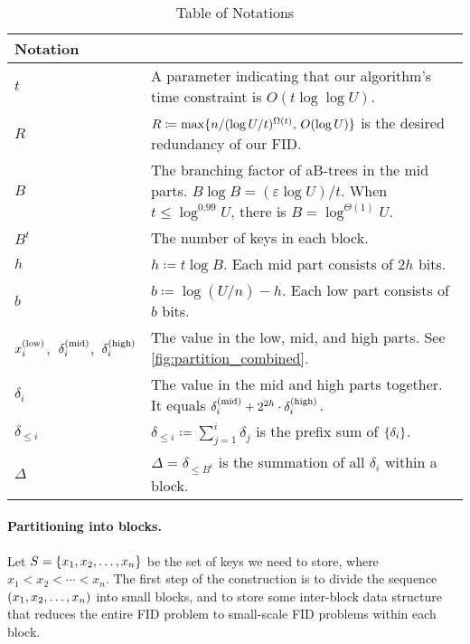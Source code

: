\documentclass{article}
\theoremstyle{plain}
\theoremstyle{definition}  \newtheorem{definition}[theorem]{Definition}
\DeclarePairedDelimiter{\bk}{(}{)}
\DeclarePairedDelimiter{\BK}{\{}{\}}
\newcommand{\defeq}{\coloneqq}
\newcommand{\eps}{\varepsilon}
\renewcommand{\epsilon}{\eps}
\newcommand{\xlow}[1][i]{x_{#1}^{(\textup{low})}}
\newcommand{\deltamid}[1][i]{\delta_{#1}^{(\textup{mid})}}
\newcommand{\deltahigh}[1][i]{\delta_{#1}^{(\textup{high})}}
\begin{document}
\begin{table}[h!]
    \centering
    \caption{Table of Notations}\label{tab:notations}
    \begin{tabular}{|>{\centering\arraybackslash}m{3cm}|>{\arraybackslash}m{12cm}|}
        \hline
        \textbf{Notation} & \multicolumn{1}{c|}{\textbf{Explanation}} \\ \hline
        $t$ &
        A parameter indicating that our algorithm's time constraint is $O(t \log \log U)$.
        \\ \hline
        $R$ &
        $R \defeq \max\BK{n / (\log U / t)^{\Omega(t)}, \, O(\log U)}$ is the desired redundancy of our FID.
        \\ \hline
        $B$ &
        The branching factor of aB-trees in the mid parts. $B \log B = (\epsilon \log U) / t$. When $t \le \log^{0.99} U$, there is
        $B = \log^{\Theta(1)} U$.
        \\ \hline
        $B^t$ &
        The number of keys in each block.
        \\ \hline
        $h$ &
        $h \defeq t \log B$. Each mid part consists of $2h$ bits.
        \\ \hline
        $b$ &
        $b \defeq \log(U/n) - h$. Each low part consists of $b$ bits.
        \\ \hline
        $\xlow$,~$\deltamid$,~$\deltahigh$ &
        The value in the low, mid, and high parts. See \cref{fig:partition_combined}.
        \\ \hline
        $\delta_i$ &
        The value in the mid and high parts together. It equals $\deltamid + 2^{2h} \cdot \deltahigh$.
        \\ \hline
        $\delta_{\le i}$ &
        $\delta_{\le i} \defeq \sum_{j=1}^i \delta_j$ is the prefix sum of $\BK{\delta_i}$.
        \\ \hline
        $\Delta$ &
        $\Delta = \delta_{\le B^t}$ is the summation of all $\delta_i$ within a block.
        \\ \hline
    \end{tabular}
\end{table}
 
\paragraph*{Partitioning into blocks.} Let $S = \BK{x_1, x_2, \ldots, x_n}$ be the set of keys we need to store, where $x_1 < x_2< \cdots < x_n$. The first step of the construction is to divide the sequence $\bk{x_1, x_2, \ldots, x_n}$ into small blocks, and to store some inter-block data structure that reduces the entire FID problem to small-scale FID problems within each block.
\end{document}
